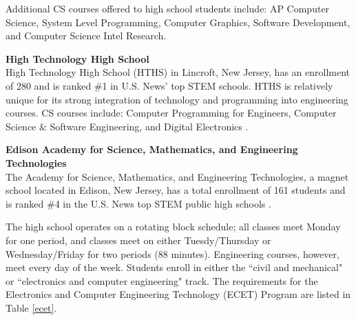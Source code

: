 Additional CS courses offered to high school students include: AP Computer Science, System Level Programming, Computer Graphics, Software Development, and Computer Science Intel Research. \par
\textbf{High Technology High School} \\
High Technology High School (HTHS) in Lincroft, New Jersey, has an enrollment of 280 and is ranked \#1 in U.S. News' top STEM schools. HTHS is relatively unique for its strong integration of technology and programming into engineering courses. CS courses include: Computer Programming for Engineers, Computer Science \& Software Engineering, and Digital Electronics \cite{hths}. \par
\textbf{Edison Academy for Science, Mathematics, and Engineering Technologies} \\
The Academy for Science, Mathematics, and Engineering Technologies, a magnet school located in Edison, New Jersey, has a total enrollment of 161 students and is ranked \#4 in the U.S. News top STEM public high schools \cite{usnews}. \par
The high school operates on a rotating block schedule; all classes meet Monday for one period, and classes meet on either Tuesdy/Thursday or Wednesday/Friday for two periods (88 minutes). Engineering courses, however, meet every day of the week. Students enroll in either the ``civil and mechanical" or ``electronics and computer engineering" track. The requirements for the Electronics and Computer Engineering Technology (ECET) Program are listed in Table \ref{ecet}. \par
